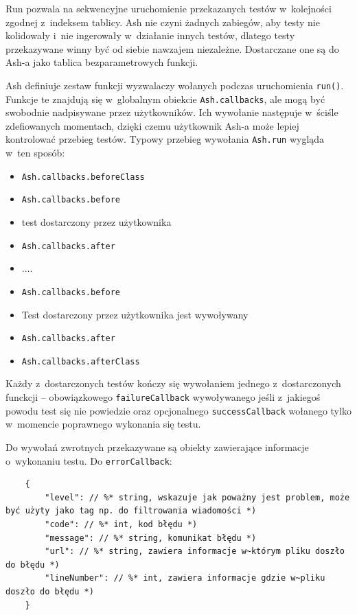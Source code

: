 \documentclass[brudnopis]{xmgr}
\begin{document}
Run pozwala na sekwencyjne uruchomienie przekazanych testów w~kolejności zgodnej z~indeksem tablicy. Ash nie czyni żadnych zabiegów, aby testy nie kolidowały i~nie ingerowały w~działanie innych testów, dlatego testy przekazywane winny być od siebie nawzajem niezależne. Dostarczane one są do Ash-a jako tablica bezparametrowych funkcji.

Ash definiuje zestaw funkcji wyzwalaczy wołanych podczas uruchomienia \texttt{run()}. Funkcje te znajdują się w~globalnym obiekcie \texttt{Ash.callbacks}, ale mogą być swobodnie nadpisywane przez użytkowników. Ich wywołanie następuje w~ściśle zdefiowanych momentach, dzięki czemu użytkownik Ash-a może lepiej kontrolować przebieg testów. Typowy przebieg wywołania \texttt{Ash.run} wygląda w~ten sposób:

\begin{itemize}
  \item \texttt{Ash.callbacks.beforeClass}
  \item \texttt{Ash.callbacks.before}
  \item {test dostarczony przez użytkownika}
  \item \texttt{Ash.callbacks.after}
  \item ....
  \item \texttt{Ash.callbacks.before}
  \item Test dostarczony przez użytkownika jest wywoływany
  \item \texttt{Ash.callbacks.after}
  \item \texttt{Ash.callbacks.afterClass}
\end{itemize}

Każdy z~dostarczonych testów kończy się wywołaniem jednego z~dostarczonych funckcji -- obowiązkowego \texttt{failureCallback} wywoływanego jeśli z~jakiegoś powodu test się nie powiedzie oraz opcjonalnego \texttt{successCallback} wołanego tylko w~momencie poprawnego wykonania się testu.

Do wywołań zwrotnych przekazywane są obiekty zawierające informacje o~wykonaniu testu. Do \texttt{errorCallback}:

\begin{lstlisting}
	{
		"level": // %* string, wskazuje jak poważny jest problem, może być użyty jako tag np. do filtrowania wiadomości *)
		"code": // %* int, kod błędu *)
		"message": // %* string, komunikat błędu *) 
		"url": // %* string, zawiera informacje w~którym pliku doszło do błędu *)
		"lineNumber": // %* int, zawiera informacje gdzie w~pliku doszło do błędu *)
	}
\end{lstlisting}
\end{document}
